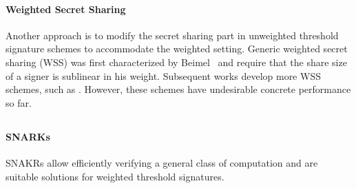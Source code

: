 \paragraph{Weighted Secret Sharing} Another approach is to modify the secret sharing part in unweighted threshold signature schemes to accommodate the weighted setting. Generic weighted secret sharing (WSS) was first characterized by Beimel~\cite{DBLP:conf/tcc/BeimelTW05} and require that the share size of a signer is sublinear in his weight. Subsequent works develop more WSS schemes, such as \cite{DBLP:conf/crypto/GargJMSWZ23}. However, these schemes have undesirable concrete performance so far. 

\subsection{}

\paragraph{SNARKs} SNAKRs allow efficiently verifying a general class of computation and are suitable solutions for weighted threshold signatures. 

